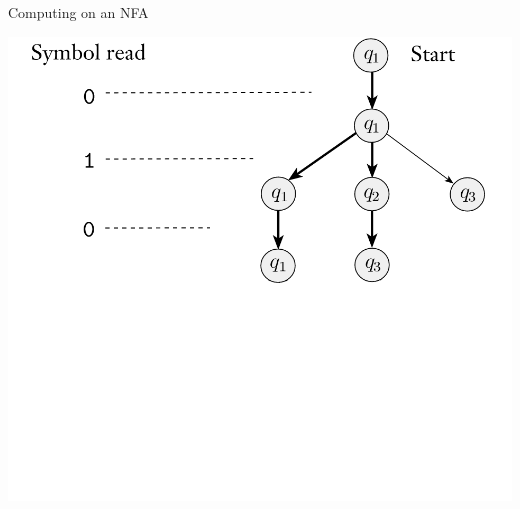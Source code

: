 \documentclass[aspectratio=169]{beamer}
\begin{document}
\begin{frame}{Computing on an NFA}
    \begin{center}
        \includegraphics[scale=0.80]{N1_compute/N1_3.png}
    \end{center}
\end{frame}
\end{document}

